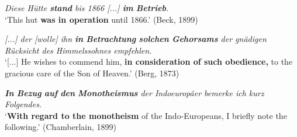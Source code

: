 \documentclass[output=paper,colorlinks,citecolor=brown]{langscibook}
\begin{document}
\ea%
\label{ex:fleissner:2}
{\itshape Diese Hütte \textbf{stand} bis 1866 [...] \textbf{im} \textbf{Betrieb}.}\\
\glt ‘This hut \textbf{was in operation} until 1866.' \hfill (Beck, 1899)
\z 

\ea%
\label{ex:fleissner:3}
{\itshape [...] der [wolle] ihn \textbf{in} \textbf{Betrachtung} \textbf{solchen} \textbf{Gehorsams} der gnädigen Rücksicht des Himmelssohnes empfehlen.}\\
\glt ‘[...] He wishes to commend him, \textbf{in consideration of such obedience,} to the gracious care of the Son of Heaven.' \hfill (Berg, 1873)
\z 

\ea%
\label{ex:fleissner:4}
{\itshape \textbf{In} \textbf{Bezug} \textbf{auf} \textbf{den} \textbf{Monotheismus} der Indoeuropäer bemerke ich kurz Folgendes.}\\
\glt ‘\textbf{With regard to the monotheism} of the Indo-Europeans, I briefly note the following.' \hfill (Chamberlain, 1899)
\z 
          
\end{document}
